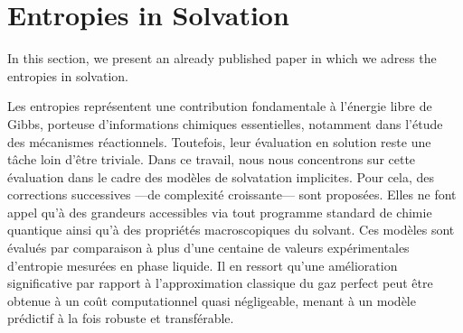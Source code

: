 \chapter{Entropies in Solvation}\label{entropies}

In this section, we present an already published paper in which we
adress the entropies in solvation.

Les entropies représentent une contribution fondamentale à l'énergie libre de
Gibbs, porteuse d'informations chimiques essentielles, notamment dans l'étude
des mécanismes réactionnels. Toutefois, leur évaluation en solution reste une
tâche loin d'être triviale. Dans ce travail, nous nous concentrons sur cette
évaluation dans le cadre des modèles de solvatation implicites. Pour cela, des
corrections successives ---de complexité croissante--- sont proposées. Elles ne
font appel qu'à des grandeurs accessibles via tout programme standard de chimie
quantique ainsi qu'à des propriétés macroscopiques du solvant. Ces modèles sont
évalués par comparaison à plus d'une centaine de valeurs expérimentales
d'entropie mesurées en phase liquide. Il en ressort qu'une amélioration
significative par rapport à l'approximation classique du gaz perfect peut être
obtenue à un coût computationnel quasi négligeable, menant à un modèle
prédictif à la fois robuste et transférable.

\newpage


